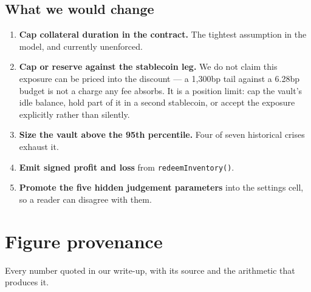 \documentclass[11pt,a4paper]{article}
\begin{document}
\subsection{What we would change}

\begin{enumerate}
\item \textbf{Cap collateral duration in the contract.} The tightest assumption in the
      model, and currently unenforced.
\item \textbf{Cap or reserve against the stablecoin leg.} We do not claim this exposure
      can be priced into the discount — a 1{,}300bp tail against a 6.28bp budget is not a
      charge any fee absorbs. It is a position limit: cap the vault's idle balance, hold
      part of it in a second stablecoin, or accept the exposure explicitly rather than
      silently.
\item \textbf{Size the vault above the 95th percentile.} Four of seven historical crises
      exhaust it.
\item \textbf{Emit signed profit and loss} from \texttt{redeemInventory()}.
\item \textbf{Promote the five hidden judgement parameters} into the settings cell, so a
      reader can disagree with them.
\end{enumerate}

\section{Figure provenance}
\label{sec:provenance}

Every number quoted in our write-up, with its source and the arithmetic that produces it.
\end{document}
